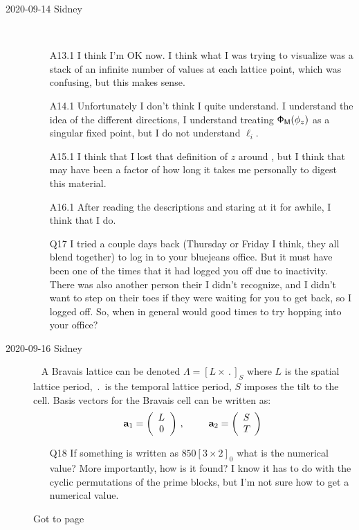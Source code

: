 \begin{description}
\item[2020-09-14 Sidney]~~
\begin{itemize}
	\item[A13.1]
I think I'm OK now. I think what I was trying to visualize was a stack of an infinite number of values at each lattice point, which was confusing, but this makes sense.
	\item[A14.1]
Unfortunately I don't think I quite understand. I understand the idea of the different directions, I understand treating
$\mathsf{\Phi}_{\mathsf{M}}(\phi_z)$ as a singular fixed point, but I do not understand $\ell_i$.
	\item[A15.1]
I think that I lost that definition of $\textit{z}$ around , but I think that may have been a factor of how long it takes me personally to digest this material.
	\item[A16.1]
After reading the descriptions and staring at it for awhile, I think that I do.
	\item[Q17]
I tried a couple days back (Thursday or Friday I think, they all blend together) to log in to your bluejeans office. But it must have been one of the times that it had logged you off due to inactivity. There was also another person their I didn't recognize, and I didn't want to step on their toes if they were waiting for you to get back, so I logged off. So, when in general would good times to try hopping into your office?
\end{itemize}

\item[2020-09-16 Sidney]~
A Bravais lattice can be denoted $\Lambda=\left[L\times\period{}\right]_S$ where $L$
is the spatial lattice period,  $\period{}$ is the temporal lattice period, $S$
imposes the tilt to the cell. Basis vectors for the Bravais cell can be
written as:
\[
\mathbf{a}_1=\left(\begin{array}{c}
  {\ensuremath{L_{}}}\\
  0{}
  \end{array}\right)
  \,,\hspace*{25pt}
\mathbf{a}_2=\left(\begin{array}{c}
  {\ensuremath{S_{}}}\\
  {T_{}}
  \end{array}\right)
  \,
\]

\begin{itemize}
	\item[Q18]
If something is written as $850[3\times2]_0$ what is the numerical value? More importantly, how is it found? I know it has to do with the cyclic permutations of the prime blocks, but I'm not sure how to get a numerical value.
\end{itemize}
Got to page 


\end{description}
